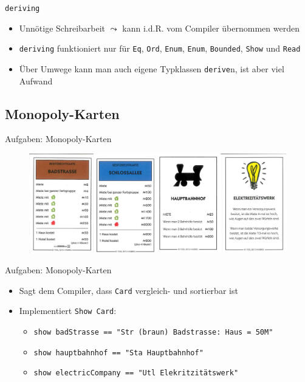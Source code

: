 \documentclass{beamer}
\newcommand{\code}[1]{
	\begin{mdframed}
		
	\end{mdframed}
}
\begin{document}
\begin{frame}{\texttt{deriving}}
	\code{demos/PlayingCards2.hs}

	\begin{itemize}
		\item Unnötige Schreibarbeit $\leadsto$ kann i.d.R. vom Compiler übernommen werden
		\item \texttt{deriving} funktioniert nur für \texttt{Eq}, \texttt{Ord}, \texttt{Enum}, \texttt{Enum}, \texttt{Bounded}, \texttt{Show} und \texttt{Read}
		\item Über Umwege kann man auch eigene Typklassen \texttt{derive}n, ist aber viel Aufwand
	\end{itemize}
\end{frame}

\subsection{Monopoly-Karten}

\begin{frame}{Aufgaben: Monopoly-Karten}
	\begin{figure}
		\includegraphics[width=\textwidth]{images/monopoly-cards}
	\end{figure}

	\code{demos/MonopolyCards.hs}
\end{frame}

\begin{frame}{Aufgaben: Monopoly-Karten}
	\code{demos/MonopolyCards.hs}

	\begin{itemize}
		\item Sagt dem Compiler, dass \texttt{Card} vergleich- und sortierbar ist
		\item Implementiert \texttt{Show Card}:
		\begin{itemize}
			\item \texttt{show badStrasse == "{}Str (braun) Badstrasse: Haus = 50M"{}}
			\item \texttt{show hauptbahnhof == "{}Sta Hauptbahnhof"{}}
			\item \texttt{show electricCompany == "{}Utl Elekritzitätswerk"{}}
		\end{itemize}
	\end{itemize}
\end{frame}
\end{document}

